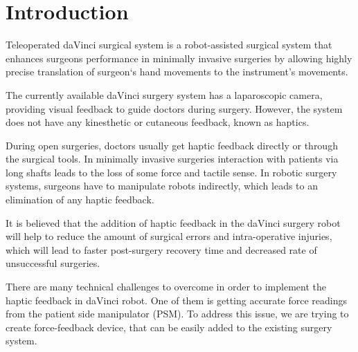 \chapter{Introduction}
\label{intro} %


Teleoperated daVinci surgical system is a robot-assisted surgical 
system that enhances surgeons performance in minimally invasive surgeries by 
allowing highly precise translation of surgeon`s hand movements to the instrument's movements. 

The currently available daVinci surgery system 
has a laparoscopic camera, providing visual feedback to guide doctors during 
surgery. However, the system does not have any kinesthetic or cutaneous feedback, 
known as haptics.\cite{_intuitive_2018} 


During open surgeries, doctors usually get haptic feedback directly or through 
the surgical tools. In minimally invasive surgeries interaction with patients 
via long shafts leads to the loss of some force and tactile sense. In robotic 
surgery systems, surgeons have to manipulate robots indirectly, which leads to 
an elimination of any haptic feedback. \cite{okamura_haptic_2009} 

It is believed that the addition of haptic feedback in the daVinci surgery 
robot will help to reduce the amount of surgical errors and intra-operative 
injuries, which will lead to faster post-surgery recovery time and decreased 
rate of unsuccessful surgeries. \cite{reiley_effects_2008, van_der_meijden_value_2009, okamura_haptic_2009}

There are many technical challenges to overcome in 
order to implement the haptic feedback in daVinci robot. One of them is 
getting accurate force readings from the patient side manipulator (PSM). 
To address this issue, we are trying to create force-feedback device, that can 
be easily added to the existing surgery system.